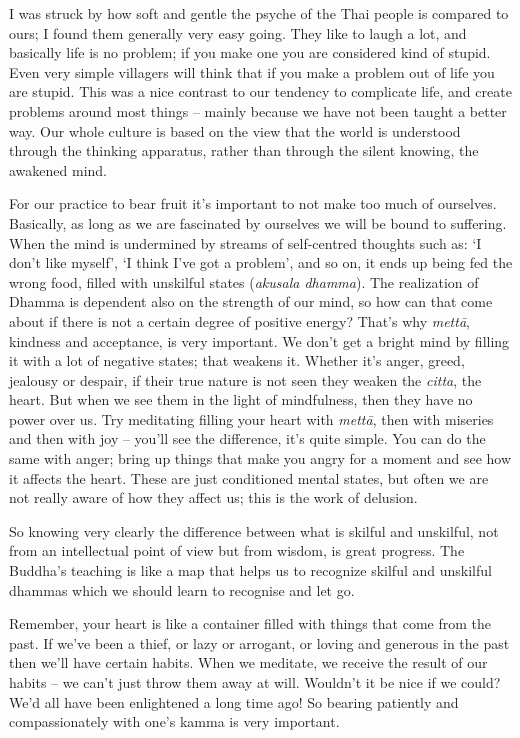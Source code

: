 I was struck by how soft and gentle the psyche of the Thai people is compared to ours; I found them generally very easy going. They like to laugh a lot, and basically life is no problem; if you make one you are considered kind of stupid. Even very simple villagers will think that if you make a problem out of life you are stupid. This was a nice contrast to our tendency to complicate life, and create problems around most things -- mainly because we have not been taught a better way. Our whole culture is based on the view that the world is understood through the thinking apparatus, rather than through the silent knowing, the awakened mind.

For our practice to bear fruit it's important to not make too much of ourselves. Basically, as long as we are fascinated by ourselves we will be bound to suffering. When the mind is undermined by streams of self-centred thoughts such as: `I don't like myself', `I think I've got a problem', and so on, it ends up being fed the wrong food, filled with unskilful states (\textit{akusala dhamma}). The realization of Dhamma is dependent also on the strength of our mind, so how can that come about if there is not a certain degree of positive energy? That's why \textit{mett\=a}, kindness and acceptance, is very important. We don't get a bright mind by filling it with a lot of negative states; that weakens it. Whether it's anger, greed, jealousy or despair, if their true nature is not seen they weaken the \textit{citta}, the heart. But when we see them in the light of mindfulness, then they have no power over us. Try meditating filling your heart with \textit{mett\=a}, then with miseries and then with joy -- you'll see the difference, it's quite simple. You can do the same with anger; bring up things that make you angry for a moment and see how it affects the heart. These are just conditioned mental states, but often we are not really aware of how they affect us; this is the work of delusion.

So knowing very clearly the difference between what is skilful and unskilful, not from an intellectual point of view but from wisdom, is great progress. The Buddha's teaching is like a map that helps us to recognize skilful and unskilful dhammas which we should learn to recognise and let go.

Remember, your heart is like a container filled with things that come from the past. If we've been a thief, or lazy or arrogant, or loving and generous in the past then we'll have certain habits. When we meditate, we receive the result of our habits -- we can't just throw them away at will. Wouldn't it be nice if we could? We'd all have been enlightened a long time ago! So bearing patiently and compassionately with one's kamma is very important.

